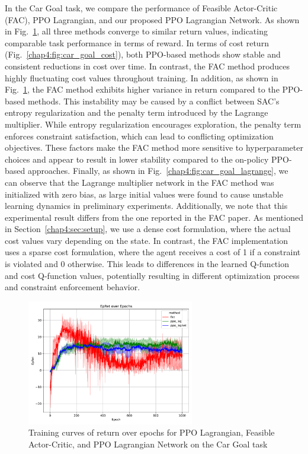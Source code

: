 In the Car Goal task, we compare the performance of Feasible Actor-Critic (FAC), PPO Lagrangian, and our proposed PPO Lagrangian Network.
As shown in Fig.~\ref{chap4:fig:car_goal_return}, all three methods converge to similar return values, indicating comparable task performance in terms of reward.
In terms of cost return (Fig.~\ref{chap4:fig:car_goal_cost}), both PPO-based methods show stable and consistent reductions in cost over time.
In contrast, the FAC method produces highly fluctuating cost values throughout training.
In addition, as shown in Fig.~\ref{chap4:fig:car_goal_return}, the FAC method exhibits higher variance in return compared to the PPO-based methods.
This instability may be caused by a conflict between SAC’s entropy regularization and the penalty term introduced by the Lagrange multiplier.
While entropy regularization encourages exploration, the penalty term enforces constraint satisfaction, which can lead to conflicting optimization objectives.
These factors make the FAC method more sensitive to hyperparameter choices and appear to result in lower stability compared to the on-policy PPO-based approaches.
Finally, as shown in Fig.~\ref{chap4:fig:car_goal_lagrange}, we can observe that the Lagrange multiplier network in the FAC method was initialized with zero bias, as large initial values were found to cause unstable learning dynamics in preliminary experiments.
Additionally, we note that this experimental result differs from the one reported in the FAC paper.
As mentioned in Section~\ref{chap4:sec:setup}, we use a dense cost formulation, where the actual cost values vary depending on the state.
In contrast, the FAC implementation uses a sparse cost formulation, where the agent receives a cost of 1 if a constraint is violated and 0 otherwise.
This leads to differences in the learned Q-function and cost Q-function values, potentially resulting in different optimization process and constraint enforcement behavior.

\begin{figure}[h]
  \centering
  \includegraphics[width=0.65\textwidth]{imgs/chap4/car_goal/return.pdf}
  \caption{Training curves of return over epochs for PPO Lagrangian, Feasible Actor-Critic, and PPO Lagrangian Network on the Car Goal task}
  \label{chap4:fig:car_goal_return}
\end{figure}

